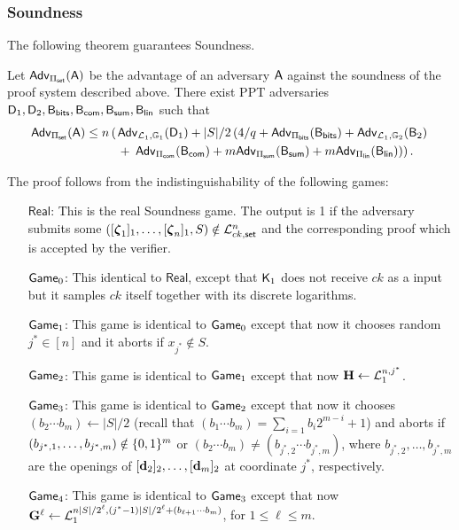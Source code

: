 \subsubsection{Soundness}

The following theorem guarantees Soundness. 
 
\begin{theorem} Let $\mathsf{Adv}_{{\Pi_{\mathsf{set}}}}(\mathsf{A})$ 
be the advantage of an adversary $\mathsf{A}$ against the soundness of 
the proof system  described above. There exist PPT adversaries
$\mathsf{D}_1,\mathsf{D}_2,\mathsf{B}_{\mathsf{bits}},\mathsf{B}_{\mathsf{com}},\mathsf{B}_{\mathsf{sum}},\mathsf{B}_\mathsf{lin}$ such that 
\begin{align*}
\mathsf{Adv}_{{\Pi_{\mathsf{set}}}}(\mathsf{A}) \leq 
n \left(\right.
    &\mathsf{Adv}_{\mathcal{L}_1,\mathbb{G}_1}(\mathsf{D}_1) 
        + |S|/2\left(4/q
            +  \mathsf{Adv}_{\Pi_{\mathsf{bits}}}(\mathsf{B}_{\mathsf{bits}})
            +  \mathsf{Adv}_{\mathcal{L}_1,\mathbb{G}_2}(\mathsf{B}_2)\right. \\
    &+ \left.\left.\mathsf{Adv}_{{\Pi_{\mathsf{com}}}}(\mathsf{B}_{\mathsf{com}})
        + m\mathsf{Adv}_{{\Pi_{\mathsf{sum}}}}(\mathsf{B}_{\mathsf{sum}})
        + m\mathsf{Adv}_{{\Pi_\mathsf{lin}}}(\mathsf{B}_\mathsf{lin})\right)\right).
\end{align*}
\label{teo:bitstr-soundness}
\end{theorem}

The proof follows from the indistinguishability of the following games:
\begin{itemize}
\item[$\mathsf{Real}$:] This is the real Soundness game. The output is 1 if the adversary submits some $([{\boldsymbol \zeta}_1]_1,\ldots,[{\boldsymbol \zeta}_n]_1,S)\notin\mathcal{L}_{ck,\mathsf{set}}^n$ and the corresponding proof which is accepted by the verifier.
\item[$\mathsf{Game}_0$:] This identical to $\mathsf{Real}$, except that $\mathsf{K}_1$ does not receive $ck$ as a input but
it samples $ck$ itself together with its discrete logarithms.
\item[$\mathsf{Game}_1$:] This game is identical to $\mathsf{Game}_0$ except that now it chooses random $j^*\in[n]$ and it aborts if $x_{j^*}\notin S$.
\item[$\mathsf{Game}_2$:] This game is identical to $\mathsf{Game}_1$ except that now $\mathbf{{H}}\gets\mathcal{L}^{n,j^*}_1$.
\item[$\mathsf{Game}_3$:] This game is identical to $\mathsf{Game}_2$ except that now it chooses $(b_2\cdots b_m)\gets |S|/2$ (recall that $(b_1\cdots b_m)=\sum_{i=1}b_i2^{m-i}+1$) and aborts if $(b_{j^*,1},\ldots,b_{j^*,m})\notin\{0,1\}^m$ or $(b_2\cdots b_m)\neq(b_{j^*,2}\cdots b_{j^*,m})$, where $b_{j^*,2},\ldots,b_{j^*,m}$ are the openings of $[\mathbf{d}_2]_2,\ldots,[\mathbf{d}_m]_2$ at coordinate $j^*$, respectively.
\item[$\mathsf{Game}_4$:] This game is identical to $\mathsf{Game}_3$ except that now $\mathbf{{G}}^\ell\gets\mathcal{L}_1^{n|S|/2^\ell,(j^*-1)|S|/2^\ell+(b_{\ell+1}\cdots b_m)}$, for $1\leq\ell\leq m$.
\end{itemize}

